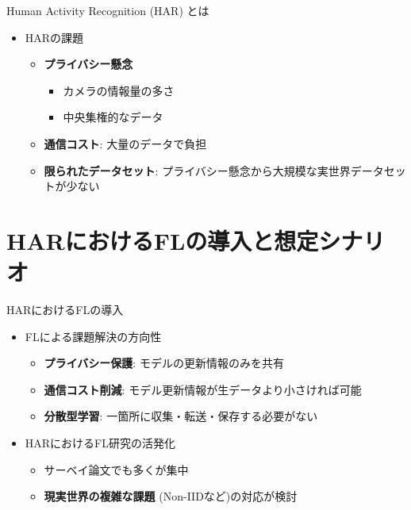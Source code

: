 \documentclass[unicode,12pt,aspectratio=169,dvipdfmx]{beamer}
\begin{document}
\begin{frame}{Human Activity Recognition (HAR) とは}
    \begin{itemize}
        \item HARの課題
        \begin{itemize}
            \item \textbf{プライバシー懸念}
                \begin{itemize}
                    \item カメラの情報量の多さ
                    \item 中央集権的なデータ
                \end{itemize}
            \item \textbf{通信コスト}: 大量のデータで負担
            \item \textbf{限られたデータセット}: プライバシー懸念から大規模な実世界データセットが少ない
        \end{itemize}
    \end{itemize}
\end{frame}



\section{HARにおけるFLの導入と想定シナリオ}
\begin{frame}{HARにおけるFLの導入}
    \begin{itemize}
        \item FLによる課題解決の方向性
        \begin{itemize}
            \item \textbf{プライバシー保護}: モデルの更新情報のみを共有
            \item \textbf{通信コスト削減}: モデル更新情報が生データより小さければ可能
            \item \textbf{分散型学習}: 一箇所に収集・転送・保存する必要がない
        \end{itemize}
        \item HARにおけるFL研究の活発化
        \begin{itemize}
            \item サーベイ論文でも多くが集中
            \item \textbf{現実世界の複雑な課題} (Non-IIDなど)の対応が検討
        \end{itemize}
    \end{itemize}
\end{frame}
\end{document}
